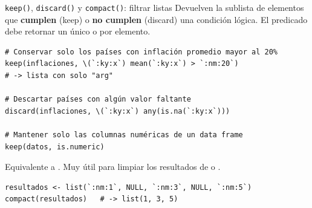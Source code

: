 \documentclass[8pt]{beamer}
\begin{document}
	\begin{frame}[fragile]{\texttt{keep()}, \texttt{discard()} y \texttt{compact()}: filtrar listas}
		Devuelven la sublista de elementos que \textbf{cumplen} (keep) o \textbf{no cumplen} (discard) una condición lógica. El predicado  debe retornar un único  o  por elemento.

\begin{lstlisting}[style=RScript]
# Conservar solo los países con inflación promedio mayor al 20%
keep(inflaciones, \(`:ky:x`) mean(`:ky:x`) > `:nm:20`)
# -> lista con solo "arg"

# Descartar países con algún valor faltante
discard(inflaciones, \(`:ky:x`) any(is.na(`:ky:x`)))

# Mantener solo las columnas numéricas de un data frame
keep(datos, is.numeric)
\end{lstlisting}

		Equivalente a . Muy útil para limpiar los resultados de  o .

\begin{lstlisting}[style=RScript]
resultados <- list(`:nm:1`, NULL, `:nm:3`, NULL, `:nm:5`)
compact(resultados)   # -> list(1, 3, 5)
\end{lstlisting}
	\end{frame}
\end{document}
